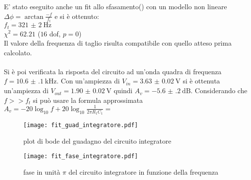 E' stato eseguito anche un fit allo sfasamento() con un modello non lineare $\Delta \phi= \arctan{\frac{-f}{f_t}}$ e si è ottenuto:\\
$f_t= \SI{321(2)}{\Hz}$\\
$\chi^2=62.21$ ($16$ dof, $p = 0$)\\
Il valore della frequenza di taglio risulta compatibile con quello atteso prima calcolato.\\
\\
Si è poi verificata la risposta del circuito ad un'onda quadra di frequenza $f= \SI{10.6(1)}{\kHz}$. Con un'ampiezza di $V_{in}=\SI{3.63(2)}{\V}$ si è ottenuta un'ampiezza di $V_{out}=\SI{1.90(2)}{\V}$ quindi $A_v=\SI{-5.6(2)}{\dB}$.
Considerando che $f>>f_t$ si può usare la formula approssimata $A_v=-20\log_{10} f +20\log_{10} \frac{1}{2\pi R_1C_1}=$




\begin{figure}[h]
	\centering
	\texttt{[image: fit\_guad\_integratore.pdf]}
	\caption{plot di bode del guadagno del circuito integratore}
	\label{f:guad_integ}
\end{figure}

\begin{figure}[h]
	\centering
	\texttt{[image: fit\_fase\_integratore.pdf]}
	\caption{fase in unità $\pi$ del circuito integratore in funzione della frequenza}
	\label{f:fase_integ}
\end{figure}